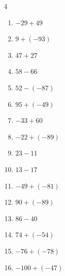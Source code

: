 \begin{multicols}{4}
\begin{enumerate}
        \phantom{$=83$}

  \item $-29+49$

        \phantom{$=20$}

  \item $9+(-93)$

        \phantom{$=-84$}

  \item $47+27$

        \phantom{$=74$}

  \item $58-66$

        \phantom{$=-8$}

  \item $52-(-87)$

        \phantom{$=139$}

\columnbreak %

  \item $95+(-49)$

        \phantom{$=46$}

  \item $-33+60$

        \phantom{$=27$}

  \item $-22+(-89)$

        \phantom{$=-111$}

  \item $23-11$

        \phantom{$=12$}

  \item $13-17$

        \phantom{$=-4$}

  \item $-49+(-81)$

        \phantom{$=-130$}

  \item $90+(-89)$

        \phantom{$=1$}

  \item $86-40$

        \phantom{$=46$}

  \item $74+(-54)$

        \phantom{$=20$}

  \item $-76+(-78)$

        \phantom{$=-154$}

  \item $-100+(-47)$


\end{enumerate}
\end{multicols}
